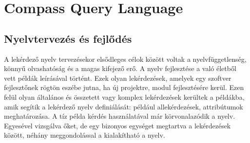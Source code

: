 \documentclass[a4paper,12pt]{report}
\begin{document}
\chapter{Compass Query Language}
\section{Nyelvtervezés és fejlődés}
A lekérdező nyelv tervezésekor elsődleges célok között voltak a nyelvfüggetlenség, könnyű olvashatóság és a magas kifejező erő. A nyelv fejlesztése a való életből vett példák leírásával történt. Ezek olyan lekérdezések, amelyek egy szoftver fejlesztőnek rögtön eszébe jutna, ha új projektre, modul fejlesztésére kerül. Ezen felül olyan általános és összetett vagy komplex lekérdezések kerültek a példákba, amik segítik a lekérdező nyelv definiálását: például allekérdezések, attribútumok meghatározása. A tíz példa kérdés használatával már körvonalazódik a nyelv. Egyesével vizsgálva őket, de egy bizonyos egységet megtartva a lekérdezések között, néhány meggondolással a kialakítható a nyelv.
\end{document}
